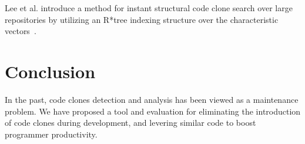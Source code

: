 \documentclass[preprint,10pt]{sigplanconf}
\begin{document}
Lee et al. introduce a method for instant structural code clone search
over large repositories by utilizing an R*tree indexing structure over
the characteristic vectors~\cite{Lee2010}.

\section{Conclusion}

In the past, code clones detection and analysis has been viewed as a
maintenance problem. We have proposed a tool and evaluation for
eliminating the introduction of code clones during development, and
levering similar code to boost programmer productivity.

%

%
%
\end{document}

